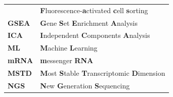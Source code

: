 \documentclass[12pt,]{book}
\theoremstyle{definition}
\theoremstyle{definition}
\theoremstyle{definition}
\theoremstyle{remark}
\begin{document}
\begin{longtable}[]{@{}ll@{}}
\begin{minipage}[t]{0.13\columnwidth}
\end{minipage} & \begin{minipage}[t]{0.81\columnwidth}\raggedright
\textbf{F}luorescence-\textbf{a}ctivated \textbf{c}ell
\textbf{s}orting\strut
\end{minipage}\tabularnewline
\begin{minipage}[t]{0.13\columnwidth}\raggedright
\textbf{GSEA}\strut
\end{minipage} & \begin{minipage}[t]{0.81\columnwidth}\raggedright
\textbf{G}ene \textbf{S}et \textbf{E}nrichment \textbf{A}nalysis\strut
\end{minipage}\tabularnewline
\begin{minipage}[t]{0.13\columnwidth}\raggedright
\textbf{ICA}\strut
\end{minipage} & \begin{minipage}[t]{0.81\columnwidth}\raggedright
\textbf{I}ndependent \textbf{C}omponents \textbf{A}nalysis\strut
\end{minipage}\tabularnewline
\begin{minipage}[t]{0.13\columnwidth}\raggedright
\textbf{ML}\strut
\end{minipage} & \begin{minipage}[t]{0.81\columnwidth}\raggedright
\textbf{M}achine \textbf{L}earning\strut
\end{minipage}\tabularnewline
\begin{minipage}[t]{0.13\columnwidth}\raggedright
\textbf{mRNA}\strut
\end{minipage} & \begin{minipage}[t]{0.81\columnwidth}\raggedright
\textbf{m}essenger \textbf{RNA}\strut
\end{minipage}\tabularnewline
\begin{minipage}[t]{0.13\columnwidth}\raggedright
\textbf{MSTD}\strut
\end{minipage} & \begin{minipage}[t]{0.81\columnwidth}\raggedright
\textbf{M}ost \textbf{S}table \textbf{T}ranscriptomic
\textbf{D}imension\strut
\end{minipage}\tabularnewline
\begin{minipage}[t]{0.13\columnwidth}\raggedright
\textbf{NGS}\strut
\end{minipage} & \begin{minipage}[t]{0.81\columnwidth}\raggedright
\textbf{N}ew \textbf{G}eneration \textbf{S}equencing\strut
\end{minipage}\tabularnewline

\end{longtable}
\end{document}
